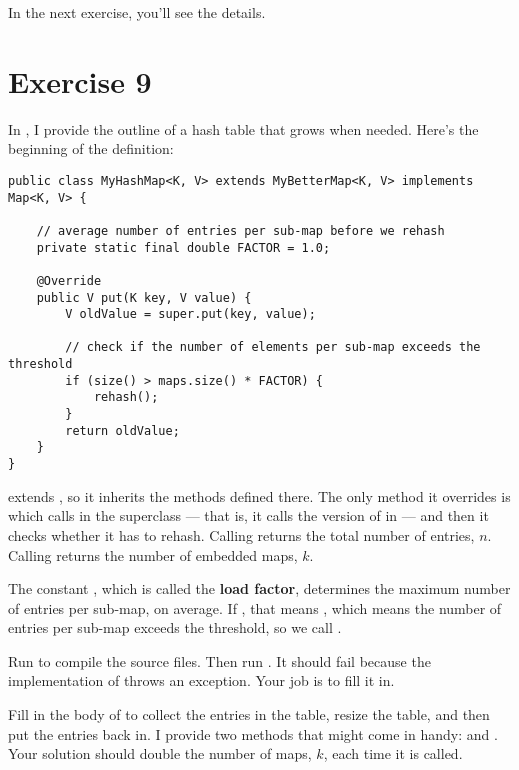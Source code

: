 \documentclass[12pt]{book}
\theoremstyle{exercise}
\begin{document}
In the next exercise, you'll see the details.


\section{Exercise 9}
\label{implementing-myhashmap}


In , I provide the outline of a hash table that
grows when needed. Here's the beginning of the definition:

\begin{verbatim}
public class MyHashMap<K, V> extends MyBetterMap<K, V> implements Map<K, V> {

    // average number of entries per sub-map before we rehash
    private static final double FACTOR = 1.0;

    @Override
    public V put(K key, V value) {
        V oldValue = super.put(key, value);

        // check if the number of elements per sub-map exceeds the threshold
        if (size() > maps.size() * FACTOR) {
            rehash();
        }
        return oldValue;
    }
}
\end{verbatim}

 extends , so it inherits the
methods defined there. The only method it overrides is 
which calls  in the superclass --- that is, it calls the
version of  in  --- and then it checks
whether it has to rehash. Calling  returns the total number
of entries, $n$. Calling  returns the number of
embedded maps, $k$.


The constant , which is called the \textbf{load factor},
determines the maximum number of entries per sub-map, on average. If
, that means
, which means the number of entries
per sub-map exceeds the threshold, so we call .


Run  to compile the source files. Then run .  It should fail because the implementation of
 throws an exception. Your job is to fill it in.


Fill in the body of  to collect the entries in the table,
resize the table, and then put the entries back in. I provide two
methods that might come in handy:  and
. Your solution should double the number
of maps, $k$, each time it is called.
\end{document}

